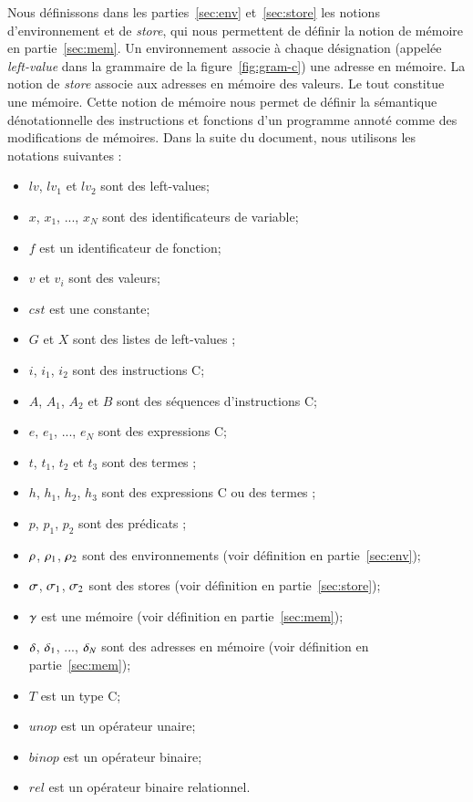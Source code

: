 Nous définissons dans les parties~\ref{sec:env} et~\ref{sec:store} les notions
d'environnement et de {\em store}, qui nous permettent de définir la notion de
mémoire en partie~\ref{sec:mem}.
Un environnement associe à chaque désignation (appelée \textit{left-value} dans
la grammaire de la figure~\ref{fig:gram-c}) une adresse en mémoire.
La notion de {\em store} associe aux adresses en mémoire des valeurs.
Le tout constitue une mémoire.
Cette notion de mémoire nous permet de définir la sémantique dénotationnelle des
instructions et fonctions d'un programme annoté comme des modifications de
mémoires.
Dans la suite du document, nous utilisons les notations suivantes :
\begin{itemize}
\item $\mathit{lv}$, $\mathit{lv_1}$ et $\mathit{lv_2}$ sont des left-values;
\item $x$, $x_1$, ..., $x_N$ sont des identificateurs de variable;
\item $f$ est un identificateur de fonction;
\item $v$ et $v_i$ sont des valeurs;
\item $\mathit{cst}$ est une constante;
\item $G$ et $X$ sont des listes de left-values \eacsl;
\item $i$, $i_1$, $i_2$ sont des instructions C;
\item $A$, $A_1$, $A_2$ et $B$ sont des séquences d'instructions C;
\item $e$, $e_1$, ..., $e_N$ sont des expressions C;
\item $t$, $t_1$, $t_2$ et $t_3$ sont des termes \eacsl;
\item $h$, $h_1$, $h_2$, $h_3$ sont des expressions C ou des termes \eacsl;
\item $p$, $p_1$, $p_2$ sont des prédicats \eacsl;
\item $\rho$, $\rho_1$, $\rho_2$ sont des environnements
  (voir définition en partie~\ref{sec:env});
\item $\sigma$, $\sigma_1$, $\sigma_2$ sont des stores
  (voir définition en partie~\ref{sec:store});
\item $\gamma$ est une mémoire (voir définition en partie~\ref{sec:mem});
\item $\delta$, $\delta_1$, ..., $\delta_N$  sont des
  adresses en mémoire (voir définition en partie~\ref{sec:mem});
\item $T$ est un type C;
\item $\mathit{unop}$ est un opérateur unaire;
\item $\mathit{binop}$ est un opérateur binaire;
\item $\mathit{rel}$ est un opérateur binaire relationnel.
\end{itemize}

